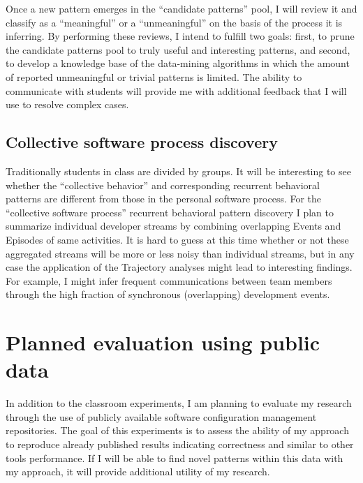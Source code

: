 Once a new pattern emerges in the ``candidate patterns'' pool, I will review it and classify as a ``meaningful'' or a ``unmeaningful'' on the basis of the process it is inferring. By performing these reviews, I intend to fulfill two goals: first, to prune the candidate patterns pool to truly useful and interesting patterns, and second, to develop a knowledge base of the data-mining algorithms in which the amount of reported unmeaningful or trivial patterns is limited. The ability to communicate with students will provide me with additional feedback that I will use to resolve complex cases.

\subsection{Collective software process discovery}
Traditionally students in class are divided by groups. It will be interesting to see whether the ``collective behavior'' and corresponding recurrent behavioral patterns are different from those in the personal software process. For the ``collective software process'' recurrent behavioral pattern discovery I plan to summarize individual developer streams by combining overlapping Events and Episodes of same activities. It is hard to guess at this time whether or not these aggregated streams will be more or less noisy than individual streams, but in any case the application of the Trajectory analyses might lead to interesting findings. For example, I might infer frequent communications between team members through the high fraction of synchronous (overlapping) development events.

\section{Planned evaluation using public data}\label{public.evaluation}
In addition to the classroom experiments, I am planning to evaluate my research through the use of publicly available software configuration management repositories. The goal of this experiments is to assess the ability of my approach to reproduce already published results indicating correctness and similar to other tools performance. If I will be able to find novel patterns within this data with my approach, it will provide additional utility of my research.

